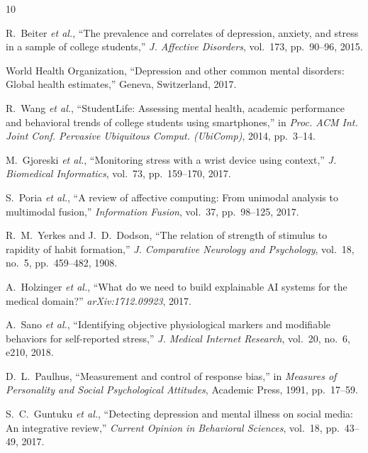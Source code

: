 \documentclass[journal]{IEEEtran}
\begin{document}

\begin{thebibliography}{10}

R.~Beiter \emph{et al.}, ``The prevalence and correlates of depression, anxiety, and stress in a sample of college students,'' \emph{J. Affective Disorders}, vol.~173, pp.~90--96, 2015.

World Health Organization, ``Depression and other common mental disorders: Global health estimates,'' Geneva, Switzerland, 2017.

R.~Wang \emph{et al.}, ``StudentLife: Assessing mental health, academic performance and behavioral trends of college students using smartphones,'' in \emph{Proc. ACM Int. Joint Conf. Pervasive Ubiquitous Comput. (UbiComp)}, 2014, pp.~3--14.

M.~Gjoreski \emph{et al.}, ``Monitoring stress with a wrist device using context,'' \emph{J. Biomedical Informatics}, vol.~73, pp.~159--170, 2017.

S.~Poria \emph{et al.}, ``A review of affective computing: From unimodal analysis to multimodal fusion,'' \emph{Information Fusion}, vol.~37, pp.~98--125, 2017.

R.~M.~Yerkes and J.~D.~Dodson, ``The relation of strength of stimulus to rapidity of habit formation,'' \emph{J. Comparative Neurology and Psychology}, vol.~18, no.~5, pp.~459--482, 1908.

A.~Holzinger \emph{et al.}, ``What do we need to build explainable AI systems for the medical domain?'' \emph{arXiv:1712.09923}, 2017.

A.~Sano \emph{et al.}, ``Identifying objective physiological markers and modifiable behaviors for self-reported stress,'' \emph{J. Medical Internet Research}, vol.~20, no.~6, e210, 2018.

D.~L.~Paulhus, ``Measurement and control of response bias,'' in \emph{Measures of Personality and Social Psychological Attitudes}, Academic Press, 1991, pp.~17--59.

S.~C.~Guntuku \emph{et al.}, ``Detecting depression and mental illness on social media: An integrative review,'' \emph{Current Opinion in Behavioral Sciences}, vol.~18, pp.~43--49, 2017.

\end{thebibliography}
\end{document}
